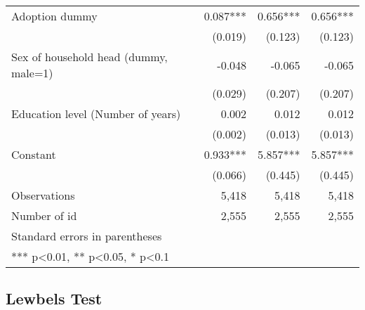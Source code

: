 \documentclass[
]{article}
\begin{document}
\begin{longtable}[t]{lrrr}
Adoption dummy & 0.087*** & 0.656*** & 0.656***\\
 & (0.019) & (0.123) & (0.123)\\
Sex of household head (dummy, male=1) & -0.048 & -0.065 & -0.065\\
 & (0.029) & (0.207) & (0.207)\\
Education level (Number of years) & 0.002 & 0.012 & 0.012\\
\addlinespace
 & (0.002) & (0.013) & (0.013)\\
Constant & 0.933*** & 5.857*** & 5.857***\\
 & (0.066) & (0.445) & (0.445)\\
Observations & 5,418 & 5,418 & 5,418\\
Number of id & 2,555 & 2,555 & 2,555\\
\addlinespace
Standard errors in parentheses &  &  & \\
*** p<0.01, ** p<0.05, * p<0.1 &  &  & \\*
\end{longtable}
\endgroup{}
\newpage

\hypertarget{lewbels-test}{%
\subsection{Lewbels Test}\label{lewbels-test}}

\begingroup\fontsize{7}{9}\selectfont
\end{document}
